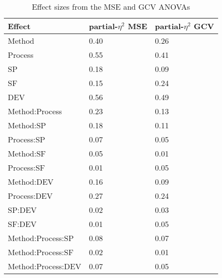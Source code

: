 \documentclass[man, floatsintext]{apa7}
\begin{document}
\begin{table}[tbp]
  \begin{center}
    \begin{threeparttable}
      \caption{Effect sizes from the MSE and GCV ANOVAs}
      \label{tab:peta}
      \begin{tabular}{lll}
        \toprule
        Effect                & \multicolumn{1}{c}{partial-$\eta^2$ MSE} &
        \multicolumn{1}{c}{partial-$\eta^2$ GCV}
        \\
        \midrule
        Method                & 0.40                                     & 0.26
        \\
        Process               & 0.55                                     & 0.41
        \\
        SP                    & 0.18                                     & 0.09
        \\
        SF                    & 0.15                                     & 0.24
        \\
        DEV                   & 0.56                                     & 0.49
        \\
        Method:Process        & 0.23                                     & 0.13
        \\
        Method:SP             & 0.18                                     & 0.11
        \\
        Process:SP            & 0.07                                     & 0.05
        \\
        Method:SF             & 0.05                                     & 0.01
        \\
        Process:SF            & 0.01                                     & 0.05
        \\
        Method:DEV            & 0.16                                     & 0.09
        \\
        Process:DEV           & 0.27                                     & 0.24
        \\
        SP:DEV                & 0.02                                     & 0.03
        \\
        SF:DEV                & 0.01                                     & 0.05
        \\
        Method:Process:SP     & 0.08                                     & 0.07
        \\
        Method:Process:SF     & 0.02                                     & 0.01
        \\
        Method:Process:DEV    & 0.07                                     & 0.05

\end{tabular}
\end{threeparttable}
\end{center}
\end{table}
\end{document}
